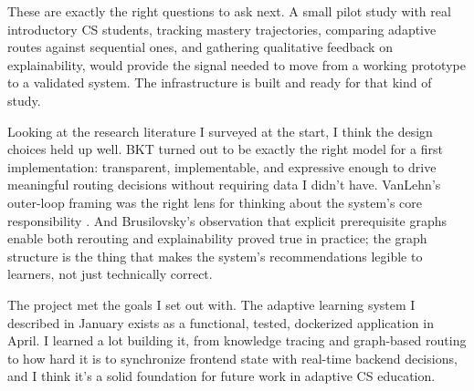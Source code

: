 \documentclass{article}
\begin{document}
These are exactly the right questions to ask next. A small pilot study with real introductory CS students, tracking mastery trajectories, comparing adaptive routes against sequential ones, and gathering qualitative feedback on explainability, would provide the signal needed to move from a working prototype to a validated system. The infrastructure is built and ready for that kind of study.

Looking at the research literature I surveyed at the start, I think the design choices held up well. BKT turned out to be exactly the right model for a first implementation: transparent, implementable, and expressive enough to drive meaningful routing decisions without requiring data I didn't have. VanLehn's outer-loop framing was the right lens for thinking about the system's core responsibility \cite{vanlehn2006}. And Brusilovsky's observation that explicit prerequisite graphs enable both rerouting and explainability \cite{brusilovsky2001} proved true in practice; the graph structure is the thing that makes the system's recommendations legible to learners, not just technically correct.

The project met the goals I set out with. The adaptive learning system I described in January exists as a functional, tested, dockerized application in April. I learned a lot building it, from knowledge tracing and graph-based routing to how hard it is to synchronize frontend state with real-time backend decisions, and I think it's a solid foundation for future work in adaptive CS education.

\end{document}
